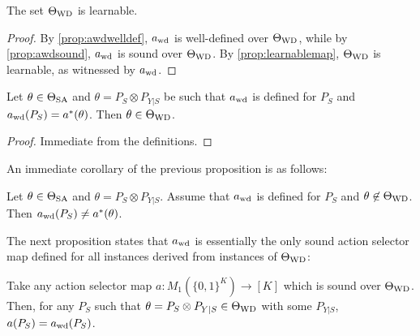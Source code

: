 \begin{cor}\label{cor:twdlearnable}
The set $\Theta_{\mathrm{WD}}$ is learnable.
\end{cor}
\begin{proof}
By \cref{prop:awdwelldef}, $a_{\mathrm{wd}}$ is well-defined over $\Theta_{\mathrm{WD}}$, while by \cref{prop:awdsound}, $a_{\mathrm{wd}}$ is sound over $\Theta_{\mathrm{WD}}$.
By \cref{prop:learnablemap}, $\Theta_{\mathrm{WD}}$ is learnable, as witnessed by $a_{\mathrm{wd}}$. 
\end{proof}
\begin{prop}
\label{prop:awdcorrectimplieswd}
Let $\theta \in \Theta_{\mathrm{SA}}$ and $\theta = P_S\otimes P_{Y|S}$ be such that $a_{\mathrm{wd}}$ is defined for $P_S$
and $a_{\mathrm{wd}}(P_S) = a^*(\theta)$. Then $\theta \in \Theta_{\mathrm{WD}}$.
\end{prop}
\begin{proof}
Immediate from the definitions.
\end{proof}
An immediate corollary of the previous proposition is as follows:
\begin{cor}\label{cor:awdoutsideincorrect}
Let $\theta \in \Theta_{\mathrm{SA}}$ and $\theta = P_S \otimes P_{Y|S}$. 
Assume that $a_{\mathrm{wd}}$ is defined for $P_S$ and $\theta \not\in \Theta_{\mathrm{WD}}$. Then $a_{\mathrm{wd}}(P_S) \ne a^*(\theta)$.
\end{cor}
The next proposition states that $a_{\mathrm{wd}}$ is essentially the only sound action selector map defined for
 all instances derived from instances of $\Theta_{\mathrm{WD}}$:
\begin{prop}\label{prop:awdunique}
Take any action selector map $a: M_1( \{0,1\}^K ) \to [K]$ which is sound over $\Theta_{\mathrm{WD}}$.
Then, for any $P_S$ such that $\theta = P_S\otimes P_{Y|S}\in \Theta_{\mathrm{WD}}$ with some $P_{Y|S}$,
 $a(P_S) = a_{\mathrm{wd}}(P_S)$.
\end{prop}


